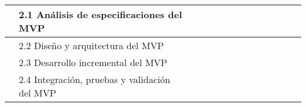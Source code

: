 \documentclass{subfiles}
\begin{document}
\begin{landscape}
\begin{table}
\begin{tabular}{|ll|ccc|ccccccccc|}
              & 2.1 Análisis de especificaciones del MVP                      & \multicolumn{1}{c|}{}                         & \multicolumn{1}{c|}{}                         & \cellcolor[HTML]{9B9B9B} & \multicolumn{1}{c|}{}                         & \multicolumn{1}{c|}{}                         & \multicolumn{1}{c|}{}                         & \multicolumn{1}{c|}{}                         & \multicolumn{1}{c|}{}                         & \multicolumn{1}{c|}{}                         & \multicolumn{1}{c|}{}                         & \multicolumn{1}{c|}{}                         &                          \\ \hline
              & 2.2 Diseño y arquitectura del MVP                             & \multicolumn{1}{c|}{}                         & \multicolumn{1}{c|}{}                         &                          & \multicolumn{1}{c|}{\cellcolor[HTML]{9B9B9B}} & \multicolumn{1}{c|}{\cellcolor[HTML]{9B9B9B}} & \multicolumn{1}{c|}{}                         & \multicolumn{1}{c|}{}                         & \multicolumn{1}{c|}{}                         & \multicolumn{1}{c|}{}                         & \multicolumn{1}{c|}{}                         & \multicolumn{1}{c|}{}                         &                          \\ \hline
              & 2.3 Desarrollo incremental del MVP                            & \multicolumn{1}{c|}{}                         & \multicolumn{1}{c|}{}                         &                          & \multicolumn{1}{c|}{}                         & \multicolumn{1}{c|}{\cellcolor[HTML]{9B9B9B}} & \multicolumn{1}{c|}{\cellcolor[HTML]{9B9B9B}} & \multicolumn{1}{c|}{}                         & \multicolumn{1}{c|}{}                         & \multicolumn{1}{c|}{}                         & \multicolumn{1}{c|}{}                         & \multicolumn{1}{c|}{}                         &                          \\ \hline
              & 2.4 Integración, pruebas y validación del MVP                 & \multicolumn{1}{c|}{}                         & \multicolumn{1}{c|}{}                         &                          & \multicolumn{1}{c|}{}                         & \multicolumn{1}{c|}{}                         & \multicolumn{1}{c|}{\cellcolor[HTML]{9B9B9B}} & \multicolumn{1}{c|}{}                         & \multicolumn{1}{c|}{}                         & \multicolumn{1}{c|}{}                         & \multicolumn{1}{c|}{}                         & \multicolumn{1}{c|}{}                         &                          \\ \hline

\end{tabular}
\end{table}
\end{landscape}
\end{document}
